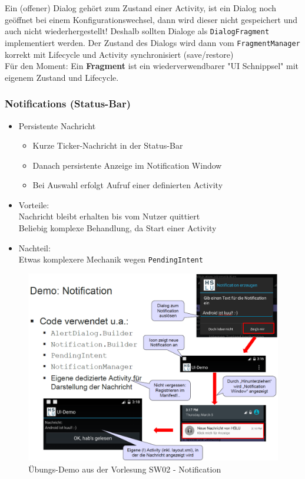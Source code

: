 \documentclass[a4paper]{article}
\begin{document}
\newpage
\noindent
Ein (offener) Dialog gehört zum Zustand einer Activity, ist ein Dialog noch geöffnet bei einem Konfigurationswechsel, dann wird dieser nicht gespeichert und auch nicht wiederhergestellt! Deshalb sollten Dialoge als \texttt{DialogFragment} implementiert werden. Der Zustand des Dialogs wird dann vom \texttt{FragmentManager} korrekt mit Lifecycle und Activity synchronisiert (save/restore)\\
Für den Moment: Ein \textbf{Fragment} ist ein wiederverwendbarer "UI Schnippsel" mit eigenem Zustand und Lifecycle.

\subsubsection{Notifications (Status-Bar)}

\begin{itemize}
	\item Persistente Nachricht
	\begin{itemize}
		\item Kurze Ticker-Nachricht in der Status-Bar
		\item Danach persistente Anzeige im Notification Window
		\item Bei Auswahl erfolgt Aufruf einer definierten Activity
	\end{itemize}
	\item Vorteile:\\
	Nachricht bleibt erhalten bis vom Nutzer quittiert\\
	Beliebig komplexe Behandlung, da Start einer Activity
	\item Nachteil:\\
	Etwas komplexere Mechanik wegen \texttt{PendingIntent}
\end{itemize}

\begin{figure}[htb!]
	\centering
	\includegraphics[width=\textwidth]{img/notification_demo.png}
	\caption{Übungs-Demo aus der Vorlesung SW02 - Notification}
\end{figure}
\end{document}
